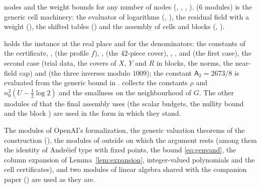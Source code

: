 \begin{description}[leftmargin=1.5em,style=nextline]
nodes and the weight bounds for any number of nodes
(, , , ).
 (6 modules) is the generic cell machinery: the evaluator of logarithms
(, ), the residual field with a weight (), the shifted tables
() and the assembly of cells and blocks (, ).
\item[The design $D$]  holds the instance at the real place and for the denominators: the
constants of the certificate, ,  (the profile $f$), ,
 (the 42-piece cover), ,
,  and  (the first case), the second case (trial
data, the covers of $X$, $Y$ and $R$ in blocks, the norms, the near-field cap) and  (the three
inverses modulo $1009$); the constant $\mathsf A_2=2673/8$ is evaluated from the generic bound in
.  collects the constants $\rho$ and
$n_0^2(U-\frac12\log2)$ and the smallness on the neighbourhood of $G$.
The other modules of  that the final assembly uses (the scalar budgets, the nullity bound
 and the block ) are used in the form in which they stand.
\end{description}
The modules of
OpenAI's formalization, the generic valuation theorems of the construction
(), the modules of  outside  on which the
argument rests (among them the identity of Andr\'eief type with fixed points, the bound
\eqref{eq:genvand}, the column expansion of Lemma~\ref{lem:expansion}, integer-valued polynomials and the
cell certificates), and two modules of linear algebra shared with the
companion paper () are used as they are.

